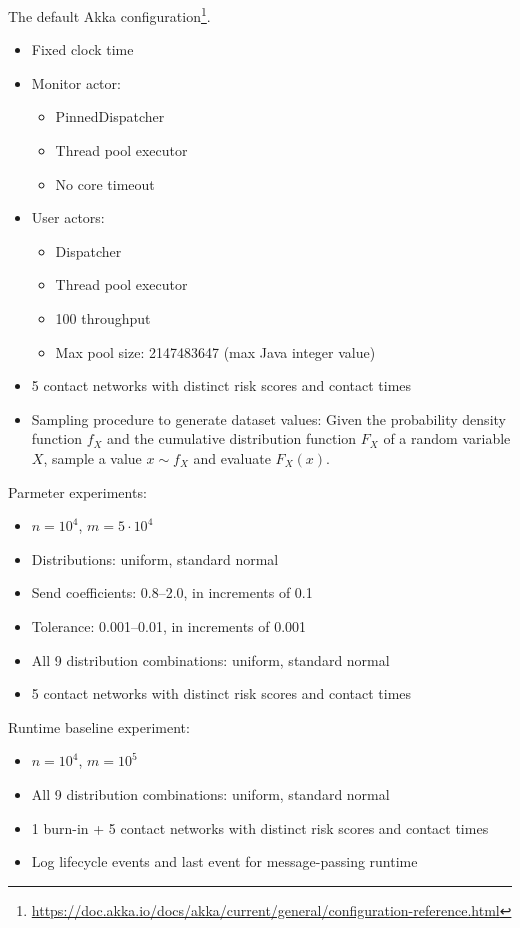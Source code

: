 The default Akka configuration\footnote{\url{https://doc.akka.io/docs/akka/current/general/configuration-reference.html}}.

\begin{itemize}
  \item Fixed clock time
  \item Monitor actor:
    \begin{itemize}
      \item PinnedDispatcher
      \item Thread pool executor 
      \item No core timeout
    \end{itemize}
  \item User actors:
    \begin{itemize}
      \item Dispatcher
      \item Thread pool executor
      \item \num{100} throughput
      \item Max pool size: \num{2147483647} (max Java integer value)
    \end{itemize}
  \item 5 contact networks with distinct risk scores and contact times
  \item Sampling procedure to generate dataset values: Given the probability density function $f_X$ and the cumulative distribution function $F_X$ of a random variable $X$, sample a value $x \sim f_X$ and evaluate $F_X(x)$.
\end{itemize}

Parmeter experiments:

\begin{itemize}
  \item $n = 10^4$, $m = 5 \cdot 10^4$
  \item Distributions: uniform, standard normal
  \item Send coefficients: 0.8–2.0, in increments of 0.1
  \item Tolerance: 0.001–0.01, in increments of 0.001
  \item All 9 distribution combinations: uniform, standard normal
  \item 5 contact networks with distinct risk scores and contact times
\end{itemize}

Runtime baseline experiment:

\begin{itemize}
  \item $n = 10^4$, $m = 10^5$
  \item All 9 distribution combinations: uniform, standard normal
  \item 1 burn-in + 5 contact networks with distinct risk scores and contact times
  \item Log lifecycle events and last event for message-passing runtime
\end{itemize}

